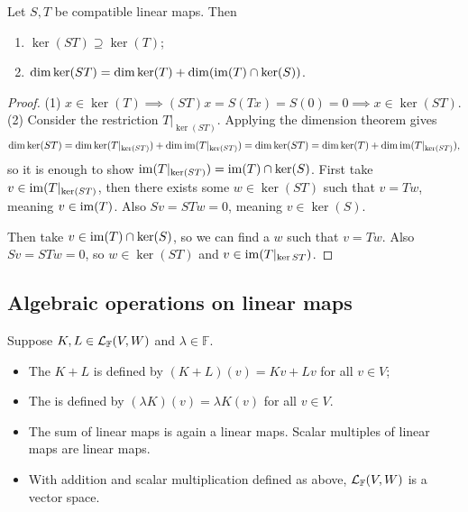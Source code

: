 \begin{proposition} \label{kernelCompositionLinearMaps}
Let $S,T$ be compatible linear maps. Then
\begin{enumerate}
\item $\ker(ST)\supseteq \ker(T)$;
\item $\dim\ker(ST) = \dim\ker(T) + \dim(\operatorname{im}(T)\cap\ker(S))$.
\end{enumerate}
\end{proposition}
\begin{proof}
(1) $x\in\ker(T) \implies (ST)x = S(Tx) = S(0) = 0 \implies x\in\ker(ST)$.
(2) Consider the restriction $T|_{\ker(ST)}$. Applying the dimension theorem gives
\[ \dim\ker(ST) = \dim\ker(T|_{\ker(ST)}) + \dim\operatorname{im}(T|_{\ker(ST)}) = \dim\ker(ST) = \dim\ker(T) + \dim\operatorname{im}(T|_{\ker(ST)}) , \]
so it is enough to show $\operatorname{im}(T|_{\ker(ST)}) = \operatorname{im}(T)\cap\ker(S)$. First take $v\in\operatorname{im}(T|_{\ker(ST)}$, then there exists some $w\in\ker(ST)$ such that $v=Tw$, meaning $v\in\operatorname{im}(T)$. Also $Sv = STw = 0$, meaning $v\in\ker(S)$.

Then take $v\in\operatorname{im}(T)\cap\ker(S)$, so we can find a $w$ such that $v = Tw$. Also $Sv = STw = 0$, so $w\in\ker(ST)$ and $v\in\operatorname{im}(T|_{\ker{ST}})$.
\end{proof}

\subsection{Algebraic operations on linear maps}
\begin{definition}
Suppose $K,L \in \operatorname{\mathcal{L}}_{\mathbb{F}}(V,W)$ and $\lambda \in \mathbb{F}$.
\begin{itemize}
\item The  $K+L$ is defined by $(K+L)(v) = Kv+Lv$ for all $v\in V$;
\item The  is defined by $(\lambda K)(v) = \lambda K(v)$ for all $v\in V$.
\end{itemize}
\end{definition}
\begin{proposition}
\begin{itemize}
\item The sum of linear maps is again a linear maps. Scalar multiples of linear maps are linear maps.
\item With addition and scalar multiplication defined as above, $\operatorname{\mathcal{L}}_\mathbb{F}(V,W)$ is a vector space.
\end{itemize}
\end{proposition}

